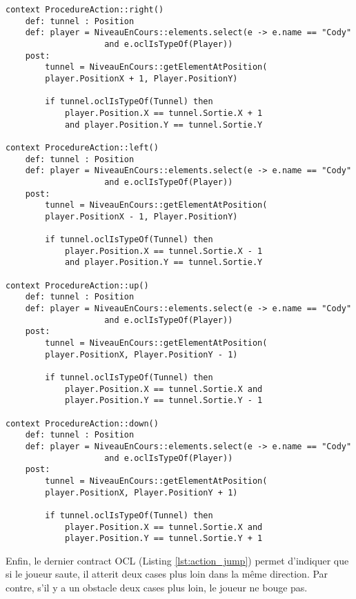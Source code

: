 \begin{lstlisting}[caption=Contract OCL pour le passage dans un tunnel,captionpos=b,label={lst:action_tunnel},language=OCL]
context ProcedureAction::right()
	def: tunnel : Position
	def: player = NiveauEnCours::elements.select(e -> e.name == "Cody"
					and e.oclIsTypeOf(Player))
	post:
		tunnel = NiveauEnCours::getElementAtPosition(
		player.PositionX + 1, Player.PositionY)
			
		if tunnel.oclIsTypeOf(Tunnel) then
			player.Position.X == tunnel.Sortie.X + 1 
			and player.Position.Y == tunnel.Sortie.Y

context ProcedureAction::left()
	def: tunnel : Position
	def: player = NiveauEnCours::elements.select(e -> e.name == "Cody"
					and e.oclIsTypeOf(Player))
	post:
		tunnel = NiveauEnCours::getElementAtPosition(
		player.PositionX - 1, Player.PositionY)
			
		if tunnel.oclIsTypeOf(Tunnel) then
			player.Position.X == tunnel.Sortie.X - 1
			and player.Position.Y == tunnel.Sortie.Y
			
context ProcedureAction::up()
	def: tunnel : Position
	def: player = NiveauEnCours::elements.select(e -> e.name == "Cody"
					and e.oclIsTypeOf(Player))
	post:
		tunnel = NiveauEnCours::getElementAtPosition(
		player.PositionX, Player.PositionY - 1)
			
		if tunnel.oclIsTypeOf(Tunnel) then
			player.Position.X == tunnel.Sortie.X and
			player.Position.Y == tunnel.Sortie.Y - 1

context ProcedureAction::down()
	def: tunnel : Position
	def: player = NiveauEnCours::elements.select(e -> e.name == "Cody"
					and e.oclIsTypeOf(Player))
	post:
		tunnel = NiveauEnCours::getElementAtPosition(
		player.PositionX, Player.PositionY + 1)
			
		if tunnel.oclIsTypeOf(Tunnel) then
			player.Position.X == tunnel.Sortie.X and
			player.Position.Y == tunnel.Sortie.Y + 1
\end{lstlisting}

Enfin, le dernier contract OCL (Listing \ref{lst:action_jump}) permet d'indiquer que si le joueur saute, il atterit deux cases plus loin dans la même direction. Par contre, s'il y a un obstacle deux cases plus loin, le joueur ne bouge pas.


